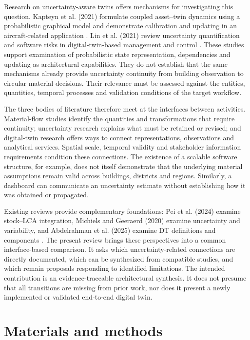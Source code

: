 Research on uncertainty-aware twins offers mechanisms for investigating this question. Kapteyn et al. (2021) formulate coupled asset–twin dynamics using a probabilistic graphical model and demonstrate calibration and updating in an aircraft-related application \citep{I33}. Lin et al. (2021) review uncertainty quantification and software risks in digital-twin-based management and control \citep{I32}. These studies support examination of probabilistic state representation, dependencies and updating as architectural capabilities. They do not establish that the same mechanisms already provide uncertainty continuity from building observation to circular material decisions. Their relevance must be assessed against the entities, quantities, temporal processes and validation conditions of the target workflow.

The three bodies of literature therefore meet at the interfaces between activities. Material-flow studies identify the quantities and transformations that require continuity; uncertainty research explains what must be retained or revised; and digital-twin research offers ways to connect representations, observations and analytical services. Spatial scale, temporal validity and stakeholder information requirements condition these connections. The existence of a scalable software structure, for example, does not itself demonstrate that the underlying material assumptions remain valid across buildings, districts and regions. Similarly, a dashboard can communicate an uncertainty estimate without establishing how it was obtained or propagated.

Existing reviews provide complementary foundations: Pei et al. (2024) examine stock–LCA integration, Michiels and Geeraerd (2020) examine uncertainty and variability, and Abdelrahman et al. (2025) examine DT definitions and components \citep{I35,I25,I31}. The present review brings these perspectives into a common interface-based comparison. It asks which uncertainty-related connections are directly documented, which can be synthesized from compatible studies, and which remain proposals responding to identified limitations. The intended contribution is an evidence-traceable architectural synthesis. It does not presume that all transitions are missing from prior work, nor does it present a newly implemented or validated end-to-end digital twin.

\section{Materials and methods}
